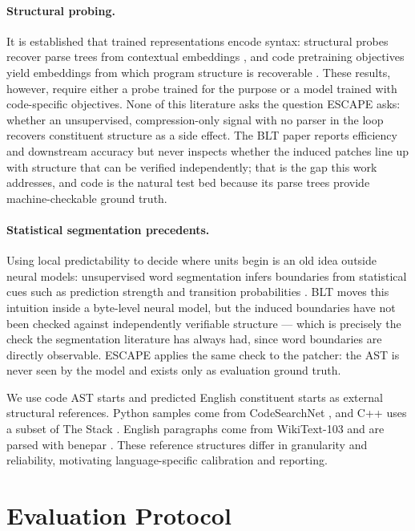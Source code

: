 \paragraph{Structural probing.}
It is established that trained representations encode syntax: structural probes recover parse trees from contextual embeddings \citep{hewitt-manning-2019-structural}, and code pretraining objectives yield embeddings from which program structure is recoverable \citep{feng-etal-2020-codebert}. These results, however, require either a probe trained for the purpose or a model trained with code-specific objectives. None of this literature asks the question ESCAPE asks: whether an unsupervised, compression-only signal with no parser in the loop recovers constituent structure as a side effect. The BLT paper reports efficiency and downstream accuracy but never inspects whether the induced patches line up with structure that can be verified independently; that is the gap this work addresses, and code is the natural test bed because its parse trees provide machine-checkable ground truth.

\paragraph{Statistical segmentation precedents.}
Using local predictability to decide where units begin is an old idea outside neural models: unsupervised word segmentation infers boundaries from statistical cues such as prediction strength and transition probabilities \citep{brent1999segmentation, goldwater2009word}. BLT moves this intuition inside a byte-level neural model, but the induced boundaries have not been checked against independently verifiable structure --- which is precisely the check the segmentation literature has always had, since word boundaries are directly observable. ESCAPE applies the same check to the patcher: the AST is never seen by the model and exists only as evaluation ground truth.

We use code AST starts and predicted English constituent starts as external structural references. Python samples come from CodeSearchNet \citep{husain2019codesearchnet}, and C++ uses a subset of The Stack \citep{kocetkov2022stack}. English paragraphs come from WikiText-103 \citep{merity2017pointer} and are parsed with benepar \citep{kitaev-klein-2018-constituency}. These reference structures differ in granularity and reliability, motivating language-specific calibration and reporting.

\section{Evaluation Protocol}
\label{sec:protocol}
